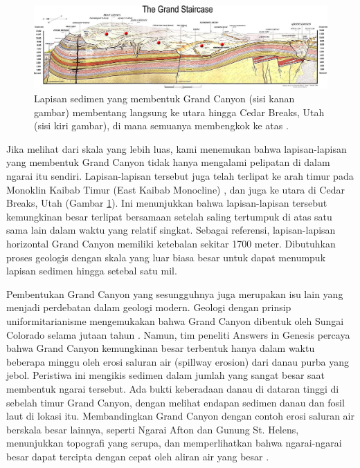 \documentclass[10pt,twocolumn,letterpaper]{article}
\begin{document}
\begin{figure}
\begin{center}
\includegraphics[width=1\textwidth]{Grand_Staircase-big.jpg}
\end{center}
   \caption{Lapisan sedimen yang membentuk Grand Canyon (sisi kanan gambar) membentang langsung ke utara hingga Cedar Breaks, Utah (sisi kiri gambar), di mana semuanya membengkok ke atas \cite{50}.}
\label{fig:4}
\end{figure}

Jika melihat dari skala yang lebih luas, kami menemukan bahwa lapisan-lapisan yang membentuk Grand Canyon tidak hanya mengalami pelipatan di dalam ngarai itu sendiri. Lapisan-lapisan tersebut juga telah terlipat ke arah timur pada Monoklin Kaibab Timur (East Kaibab Monocline) \cite{46}, dan juga ke utara di Cedar Breaks, Utah (Gambar \ref{fig:4}). Ini menunjukkan bahwa lapisan-lapisan tersebut kemungkinan besar terlipat bersamaan setelah saling tertumpuk di atas satu sama lain dalam waktu yang relatif singkat. Sebagai referensi, lapisan-lapisan horizontal Grand Canyon memiliki ketebalan sekitar 1700 meter. Dibutuhkan proses geologis dengan skala yang luar biasa besar untuk dapat menumpuk lapisan sedimen hingga setebal satu mil.

Pembentukan Grand Canyon yang sesungguhnya juga merupakan isu lain yang menjadi perdebatan dalam geologi modern. Geologi dengan prinsip uniformitarianisme mengemukakan bahwa Grand Canyon dibentuk oleh Sungai Colorado selama jutaan tahun \cite{47}. Namun, tim peneliti Answers in Genesis percaya bahwa Grand Canyon kemungkinan besar terbentuk hanya dalam waktu beberapa minggu oleh erosi saluran air (spillway erosion) dari danau purba yang jebol. Peristiwa ini mengikis sedimen dalam jumlah yang sangat besar saat membentuk ngarai tersebut. Ada bukti keberadaan danau di dataran tinggi di sebelah timur Grand Canyon, dengan melihat endapan sedimen danau dan fosil laut di lokasi itu. Membandingkan Grand Canyon dengan contoh erosi saluran air berskala besar lainnya, seperti Ngarai Afton dan Gunung St. Helens, menunjukkan topografi yang serupa, dan memperlihatkan bahwa ngarai-ngarai besar dapat tercipta dengan cepat oleh aliran air yang besar \cite{48}.
\end{document}
